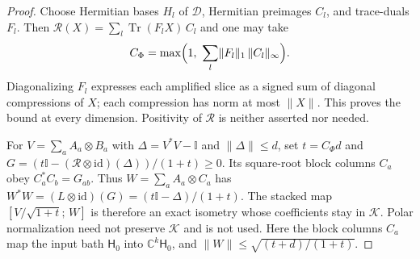 \documentclass[11pt,a4paper]{article}
\numberwithin{equation}{section}
\theoremstyle{plain}
\theoremstyle{definition}
\DeclareMathOperator{\Tr}{Tr}
\newcommand{\rg}[1]{\mathsf{#1}}
\newcommand{\id}{\mathrm{id}}
\newcommand{\one}{\mathbb{I}}
\newcommand{\CC}{\mathbb{C}}
\newcommand{\Rmap}{\mathcal{R}}            %
\begin{document}
\begin{proof}
Choose Hermitian bases $H_l$ of $\mathcal{D}$, Hermitian preimages $C_l$, and
trace-duals $F_l$. Then $\Rmap(X)=\sum_l \Tr(F_l X)\,C_l$ and one may take
\begin{equation}
\label{eq:gram-completion}
C_\Phi=\max\Bigl(1,\ \sum_l \lVert F_l\rVert_1\,\lVert C_l\rVert_\infty\Bigr).
\end{equation}
Diagonalizing $F_l$ expresses each amplified slice as a signed sum of diagonal
compressions of $X$; each compression has norm at most $\lVert X\rVert$. This
proves the bound at every dimension. Positivity of $\Rmap$ is neither asserted
nor needed.

For $V=\sum_a A_a\otimes B_a$ with $\Delta=V^*V-\one$ and
$\lVert\Delta\rVert\le d$, set $t=C_\Phi d$ and
$G=(t\one-(\Rmap\otimes\id)(\Delta))/(1+t)\ge 0$. Its square-root block
columns $C_a$ obey $C_a^*C_b=G_{ab}$. Thus $W=\sum_a A_a\otimes C_a$ has
$W^*W=(L\otimes\id)(G)=(t\one-\Delta)/(1+t)$. The stacked map
$[V/\sqrt{1+t};\,W]$ is therefore an exact isometry whose coefficients stay in
$\mathcal{K}$. Polar normalization need not preserve $\mathcal{K}$ and is not
used. Here the block columns $C_a$ map the input bath $\rg{H}_0$ into
$\CC^k\rg{H}_0$, and $\lVert W\rVert\le\sqrt{(t+d)/(1+t)}$.
\end{proof}
\end{document}
